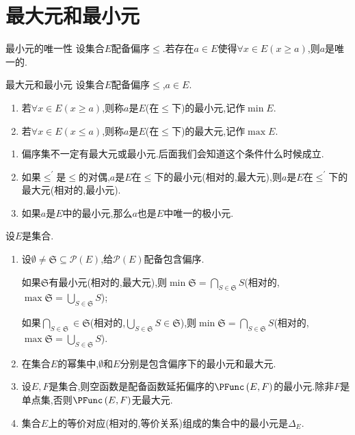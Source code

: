 \section{最大元和最小元}

\begin{proposition}{最小元的唯一性}{}
	设集合$E$配备偏序$\leq$.若存在$a\in E$使得$\forall x\in E\left(x\geq a\right)$,则$a$是唯一的.
\end{proposition}

\begin{definition}{最大元和最小元}{}
	设集合$E$配备偏序$\leq$,$a\in E$.
	\begin{enumerate}
		\item 若$\forall x\in E\left(x\geq a\right)$,则称$a$是$E$(在$\leq$下)的最小元,记作$\min E$.
		\item 若$\forall x\in E\left(x\leq a\right)$,则称$a$是$E$(在$\leq$下)的最大元,记作$\max E$.
	\end{enumerate}
\end{definition}

\begin{remark}{}{}
	\begin{enumerate}
		\item 偏序集不一定有最大元或最小元.后面我们会知道这个条件什么时候成立.
		\item 如果$\leq^{\prime}$是$\leq$的对偶,$a$是$E$在$\leq$下的最小元(相对的,最大元),则$a$是$E$在$\leq^{\prime}$下的最大元(相对的,最小元).
		\item 如果$a$是$E$中的最小元,那么$a$也是$E$中唯一的极小元.
	\end{enumerate}
\end{remark}

\begin{example}{}{}
	设$E$是集合.
	\begin{enumerate}
		\item 设$\emptyset\neq\mathfrak{S}\subseteq\mathcal{P}\left(E\right)$,给$\mathcal{P}\left(E\right)$配备包含偏序.
		
		如果$\mathfrak{S}$有最小元(相对的,最大元),则$\min\mathfrak{S}=\bigcap\limits_{S\in\mathfrak{S}}S$(相对的,$\max\mathfrak{S}=\bigcup\limits_{S\in\mathfrak{S}}S$);
		
		如果$\bigcap\limits_{S\in\mathfrak{S}}\in\mathfrak{S}$(相对的,$\bigcup\limits_{S\in\mathfrak{S}}S\in\mathfrak{S}$),则$\min\mathfrak{S}=\bigcap\limits_{S\in\mathfrak{S}}S$(相对的,$\max\mathfrak{S}=\bigcup\limits_{S\in\mathfrak{S}}S$).
		\item 在集合$E$的幂集中,$\emptyset$和$E$分别是包含偏序下的最小元和最大元.
		\item 设$E,F$是集合,则空函数是配备函数延拓偏序的$\PFunc\left(E,F\right)$的最小元.除非$F$是单点集,否则$\PFunc\left(E,F\right)$无最大元.
		\item 集合$E$上的等价对应(相对的,等价关系)组成的集合中的最小元是$\Delta_{E}$.
	\end{enumerate}
\end{example}

